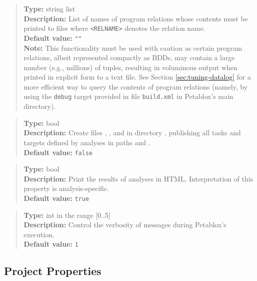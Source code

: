 \begin{quote}
{\bf Type:} string list  \\
{\bf Description:} List of names of program relations whose contents must be printed to files  where
{\tt <RELNAME>} denotes the relation name. \\
{\bf Default value:} {\tt ""} \\
{\bf Note:} This functionality must be used with caution as certain program relations, albeit represented compactly as BDDs, may contain
 a large number (e.g., millions) of tuples, resulting in voluminous output when printed in explicit form to a text file.  See Section
 \ref{sec:tuning-datalog} for a more efficient way to query the contents of program relations (namely, by using the {\tt debug}
 target provided in file {\tt build.xml} in Petablox's main directory).
\end{quote}

\begin{quote}
{\bf Type:} bool \\
{\bf Description:} Create files , , and 
 in directory , publishing all tasks and targets defined by analyses in paths  and
 .  \\
{\bf Default value:} {\tt false}
\end{quote}

\begin{quote}
{\bf Type:} bool \\
{\bf Description:} Print the results of analyses in HTML.  Interpretation of this property is analysis-specific.  \\
{\bf Default value:} {\tt true}
\end{quote}

\begin{quote}
{\bf Type:} int in the range [0..5]  \\
{\bf Description:} Control the verbosity of messages during Petablox's execution.  \\
{\bf Default value:} {\tt 1}
\end{quote}

\subsection{Project Properties}
\label{sec:project-props}

